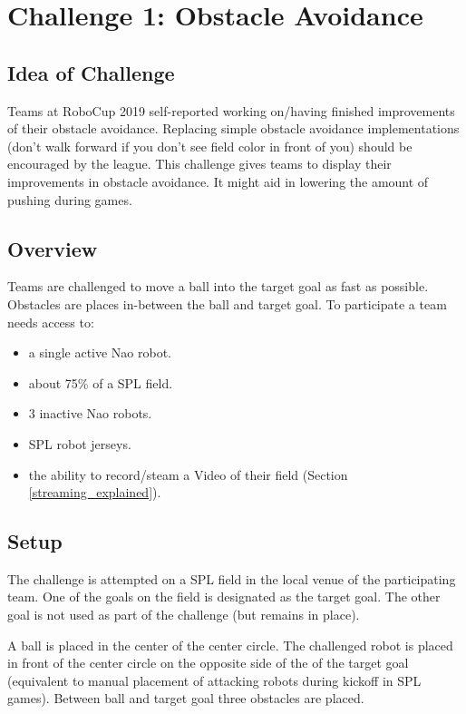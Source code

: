 \section{Challenge 1: Obstacle Avoidance}

\subsection{Idea of Challenge}

Teams at RoboCup 2019 self-reported working on/having finished improvements of their obstacle avoidance. Replacing simple obstacle avoidance implementations (don't walk forward if you don't see field color in front of you) should be encouraged by the league. This challenge gives teams to display their improvements in obstacle avoidance. It might aid in lowering the amount of pushing during games.

\subsection{Overview}

Teams are challenged to move a ball into the target goal as fast as possible. Obstacles are places in-between the ball and target goal. To participate a team needs access to:

\begin{itemize}
	\item a single active Nao robot.
	\item about 75\% of a SPL field.
	\item 3 inactive Nao robots.
	\item SPL robot jerseys.
	\item the ability to record/steam a Video of their field (\cf Section \ref{streaming_explained}).
\end{itemize}

\subsection{Setup}

The challenge is attempted on a SPL field in the local venue of the participating team. One of the goals on the field is designated as the target goal. The other goal is not used as part of the challenge (but remains in place).

A ball is placed in the center of the center circle. The challenged robot is placed in front of the center circle on the opposite side of the of the target goal (equivalent to manual placement of attacking robots during kickoff in SPL games). Between ball and target goal three obstacles are placed.

